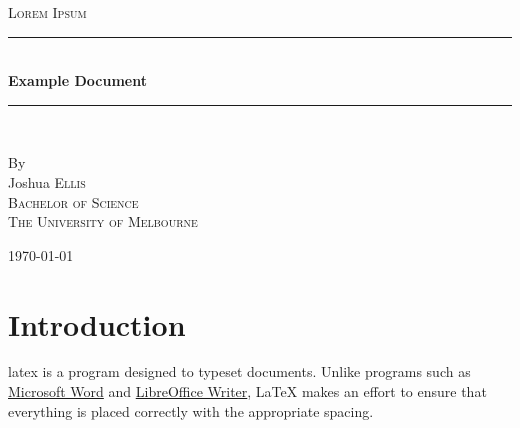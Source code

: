 \documentclass[a4paper,twoside,11pt,final]{article}
\begin{document}
\pagestyle{empty}

\newcommand{\HRule}{\rule{\linewidth}{0.5mm}}

\begin{titlepage}

    \begin{center}
        \textsc{\huge Lorem Ipsum}\\[3cm]

        \HRule \\[0.5cm]
        \Huge \textbf{Example Document}\\[0.5cm]
        \HRule \\[1.5cm]

        \begin{minipage}{0.4\textwidth}
        \begin{center}

        \large By \\[0.75cm]
        \huge Joshua \scshape Ellis \\[0.5cm]
        \normalsize \normalfont Bachelor of Science \\
        The University of Melbourne \\

        \end{center}
        \end{minipage}

        \vfill

        \large \today
    \end{center}

\newpage

\end{titlepage}


\pagestyle{empty}
\tableofcontents
\clearpage


\pagestyle{fancy}


\section{Introduction}

\Gls{latex} is a program designed to typeset documents.  Unlike programs such as
\href{http://office.microsoft.com/en-au/word/}{Microsoft Word} and
\href{http://www.libreoffice.org/discover/writer/}{LibreOffice Writer}, LaTeX
makes an effort to ensure that everything is placed correctly with the
appropriate spacing.
\end{document}
